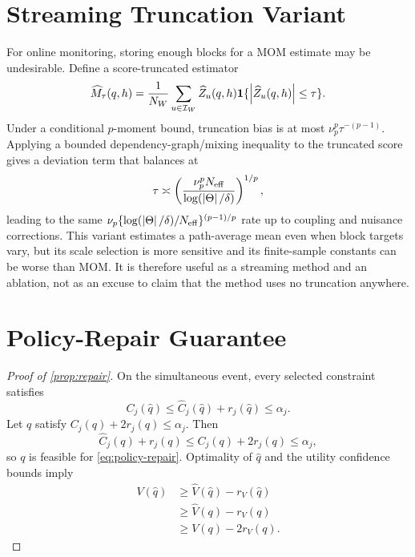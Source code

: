 \section{Streaming Truncation Variant}
\label{app:streaming}

For online monitoring, storing enough blocks for a MOM estimate may be undesirable. Define a score-truncated estimator
\begin{equation}
\widehat M_{\tau}(q,h)
=\frac1{N_W}\sum_{u\in\mathcal{I}_W}
\widehat Z_u(q,h)\mathbf{1}\{\left|\widehat Z_u(q,h)\right|\le\tau\}.
\end{equation}
Under a conditional $p$-moment bound, truncation bias is at most $\nu_p^p\tau^{-(p-1)}$. Applying a bounded dependency-graph/mixing inequality to the truncated score gives a deviation term that balances at
\begin{equation}
\tau\asymp
\left(
\frac{\nu_p^pN_{\mathrm{eff}}}
     {\log(\left|\Theta\right|/\delta)}
\right)^{1/p},
\end{equation}
leading to the same $\nu_p\{\log(\left|\Theta\right|/\delta)/N_{\mathrm{eff}}\}^{(p-1)/p}$ rate up to coupling and nuisance corrections. This variant estimates a path-average mean even when block targets vary, but its scale selection is more sensitive and its finite-sample constants can be worse than MOM. It is therefore useful as a streaming method and an ablation, not as an excuse to claim that the method uses no truncation anywhere.

\section{Policy-Repair Guarantee}
\label{app:repair-proof}

\begin{proof}[Proof of \cref{prop:repair}]
On the simultaneous event, every selected constraint satisfies
\begin{equation}
C_j(\widehat q)\le\widehat C_j(\widehat q)+r_j(\widehat q)\le\alpha_j.
\end{equation}
Let $q$ satisfy $C_j(q)+2r_j(q)\le\alpha_j$. Then
\begin{equation}
\widehat C_j(q)+r_j(q)
\le C_j(q)+2r_j(q)\le\alpha_j,
\end{equation}
so $q$ is feasible for \cref{eq:policy-repair}. Optimality of $\widehat q$ and the utility confidence bounds imply
\begin{align*}
V(\widehat q)
&\ge\widehat V(\widehat q)-r_V(\widehat q)\\
&\ge\widehat V(q)-r_V(q)\\
&\ge V(q)-2r_V(q).
\end{align*}
\end{proof}

